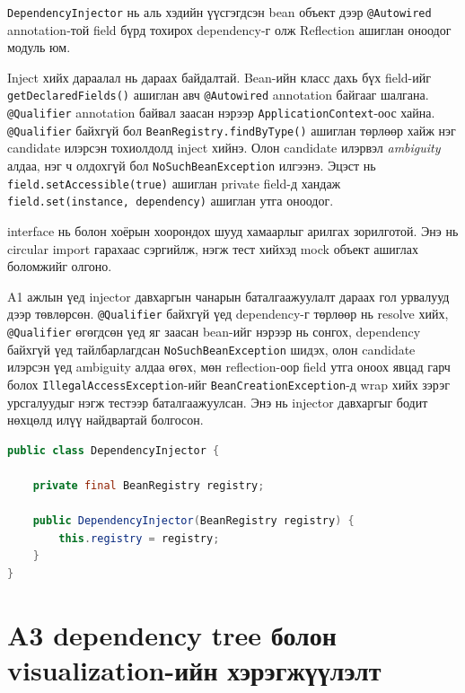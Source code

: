 \texttt{DependencyInjector} нь аль хэдийн үүсгэгдсэн bean объект
дээр \texttt{@Autowired} annotation-той field бүрд тохирох
dependency-г олж Reflection ашиглан оноодог модуль юм.

Inject хийх дараалал нь дараах байдалтай. Bean-ийн класс дахь
бүх field-ийг \texttt{getDeclaredFields()} ашиглан авч
\texttt{@Autowired} annotation байгааг шалгана. \texttt{@Qualifier}
annotation байвал заасан нэрээр \texttt{ApplicationContext}-оос
хайна. \texttt{@Qualifier} байхгүй бол \texttt{BeanRegistry.findByType()}
ашиглан төрлөөр хайж нэг candidate илэрсэн тохиолдолд inject хийнэ.
Олон candidate илэрвэл \textit{ambiguity} алдаа, нэг ч олдохгүй бол
\texttt{NoSuchBeanException} илгээнэ. Эцэст нь
\texttt{field.setAccessible(true)} ашиглан private field-д хандаж
\texttt{field.set(instance, dependency)} ашиглан утга оноодог.

 interface нь
 болон  хоёрын
хоорондох шууд хамаарлыг арилгах зорилготой. Энэ нь circular import
гарахаас сэргийлж, нэгж тест хийхэд mock объект ашиглах боломжийг
олгоно.

A1 ажлын үед injector давхаргын чанарын баталгаажуулалт дараах гол
урвалууд дээр төвлөрсөн. \texttt{@Qualifier} байхгүй үед dependency-г
төрлөөр нь resolve хийх, \texttt{@Qualifier} өгөгдсөн үед яг заасан
bean-ийг нэрээр нь сонгох, dependency байхгүй үед тайлбарлагдсан
\texttt{NoSuchBeanException} шидэх, олон candidate илэрсэн үед ambiguity
алдаа өгөх, мөн reflection-оор field утга оноох явцад гарч болох
\texttt{IllegalAccessException}-ийг \texttt{BeanCreationException}-д wrap
хийх зэрэг урсгалуудыг нэгж тестээр баталгаажуулсан. Энэ нь injector
давхаргыг бодит нөхцөлд илүү найдвартай болгосон.

\begin{lstlisting}[language=Java,
    caption={\texttt{DependencyInjector} классын хэрэгжүүлэлт},
    label={lst:dependencyinjector}]
public class DependencyInjector {

    private final BeanRegistry registry;

    public DependencyInjector(BeanRegistry registry) {
        this.registry = registry;
    }
}
\end{lstlisting}

\section{A3 dependency tree болон visualization-ийн хэрэгжүүлэлт}

